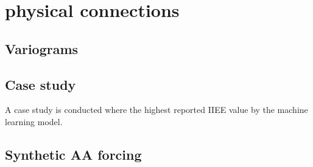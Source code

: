 \documentclass[../main/thesis.tex]{subfiles}
\begin{document}
\section{physical connections}

\subsection{Variograms}

\subsection{Case study}
A case study is conducted where the highest reported IIEE value by the machine learning model.

\subsection{Synthetic AA forcing}


\end{document}
